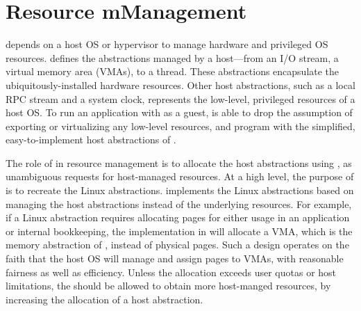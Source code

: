 \section{Resource mManagement}
\label{sec:libos:resource}


\Thelibos{}
depends on a host OS or hypervisor to manage hardware and privileged OS resources.
\Thehostabi{}
defines the abstractions managed by a host---from an I/O stream, a virtual memory area (VMAs), to a thread. %
These abstractions encapsulate the ubiquitously-installed hardware resources.
Other host abstractions, %
such as a local RPC stream and a system clock,
represents the low-level, privileged resources of a host OS.
To run an application with \thelibos{} as a guest,
\graphene{} is able to drop the assumption of exporting or virtualizing %
any low-level resources,
and program \thelibos{} with the simplified, easy-to-implement host abstractions of \thehostabi{}.




The role of \thelibos{} in resource management
is to allocate the host abstractions using \thehostabi{},
as unambiguous requests %
for host-managed resources.
At a high level, the purpose of \thelibos{} is to recreate the Linux abstractions.
\Thelibos{} implements the Linux abstractions
based on managing the host abstractions instead of
the underlying resources.
For example, if a Linux abstraction requires allocating pages
for either usage in an application or
internal bookkeeping,
the implementation in
\thelibos{} will allocate a VMA, which is the memory abstraction of \thehostabi{}, instead of physical pages.
Such a \libos{} design operates on the faith that the host OS will manage and assign pages to VMAs, with reasonable fairness as well as efficiency.
Unless the allocation exceeds user quotas or host limitations,
the \libos{} should be allowed to obtain more host-manged resources,
by increasing the allocation of a host abstraction.



